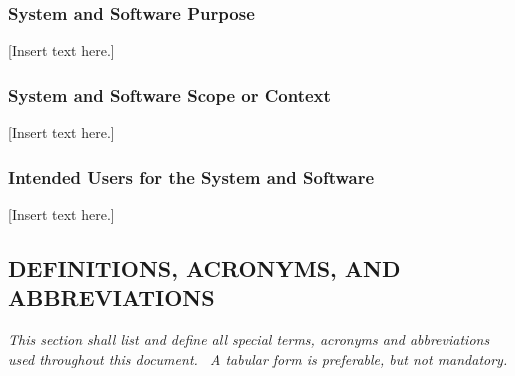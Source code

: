 \documentclass[twoside,letterpaper]{article}
\begin{document}
\subsubsection{System and Software Purpose}

[Insert text here.]

\subsubsection{System and Software Scope or Context}

[Insert text here.]

\subsubsection{Intended Users for the System and Software}
[Insert text here.]

\subsection{DEFINITIONS, ACRONYMS, AND ABBREVIATIONS}
{\itshape\color{black}
This section shall list and define all special terms, acronyms and
abbreviations used throughout this document. \ A tabular form is
preferable, but not mandatory.}


\bigskip
\end{document}
